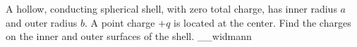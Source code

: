 A hollow, conducting spherical shell, with zero total charge, has
inner radius $a$ and outer radius $b$. A point charge $+q$ is located at the
center.  Find the charges on the inner and outer surfaces of the
shell.
__widmann
\answercheck
